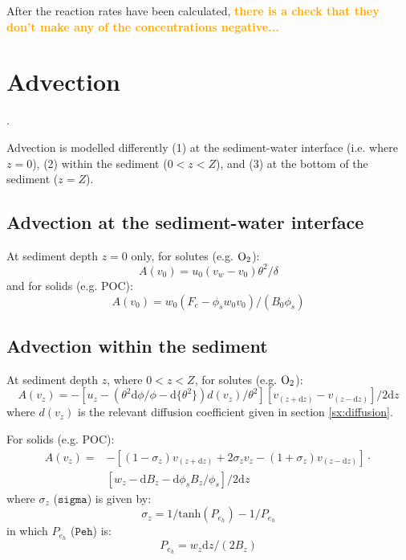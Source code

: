 \documentclass[a4paper]{article}
\newcommand{\D}[1]{\mathrm{d}#1}
\newcommand{\code}[1]{\texttt{#1}}
\newcommand{\codenote}[1]{\textcolor{Orange}{\textbf{#1}}}
\begin{document}
After the reaction rates have been calculated, \codenote{there is a check that they don't make any of the concentrations negative...}


\section{Advection}\label{sx:advection}.

Advection is modelled differently (1) at the sediment-water interface (i.e. where $z = 0$), (2) within the sediment ($0 < z < Z$), and (3) at the bottom of the sediment ($z = Z$).

\subsection{Advection at the sediment-water interface}\label{sx:adv_swi}

At sediment depth $z = 0$ only, for solutes (e.g. $\ce{O2}$):
\begin{equation}
A(v_0) = u_0 (v_w - v_0) \theta^2 / \delta
\end{equation}
and for solids (e.g. POC):
\begin{equation}
A(v_0) = w_0 (F_c - \phi_s w_0 v_0) / (B_0 \phi_s)
\end{equation}

\subsection{Advection within the sediment}

At sediment depth $z$, where $0 < z < Z$, for solutes (e.g. $\ce{O2}$):
\begin{equation}
A(v_z) = -[u_z - (\theta^2 \D{\phi} / \phi - \D{\{\theta^2\}}) d(v_z) / \theta^2] [v_{(z+\D{z})} - v_{(z-\D{z})}] / 2 \D{z}
\end{equation}
where $d(v_z)$ is the relevant diffusion coefficient given in section \ref{sx:diffusion}.

For solids (e.g. POC):
\begin{equation}
\begin{split}
A(v_z) = & -[(1 - \sigma_z) v_{(z+\D{z})} + 2 \sigma_z v_z - (1 + \sigma_z) v_{(z-\D{z})}] \cdot \\
& [w_z - \D{B_z} - \D{\phi_s} B_z / \phi_s] / 2 \D{z}
\end{split}
\end{equation}
where $\sigma_z$ ($\code{sigma}$) is given by:
\begin{equation}
\sigma_z = 1 / \mathrm{tanh}(P_{e_h}) - 1 / P_{e_h}
\end{equation}
in which $P_{e_h}$ ($\code{Peh}$) is:
\begin{equation}
P_{e_h} = w_z \D{z} / (2 B_z)
\end{equation}
\end{document}
